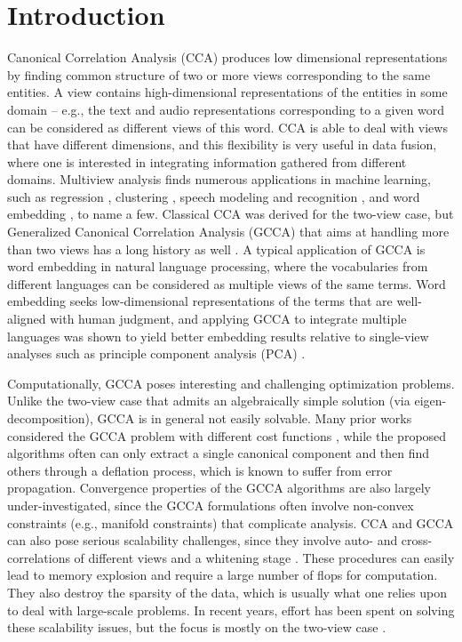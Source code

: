 \documentclass[10pt,journal]{IEEEtran}
\begin{document}
\section{Introduction}
Canonical Correlation Analysis (CCA) \cite{hardoon2004canonical} produces low dimensional representations by finding common structure of two or more views corresponding to the same entities.
A view contains high-dimensional representations of the entities in some domain -- e.g., the text and audio representations corresponding to a given word can be considered as different views of this word.
CCA is able to deal with views that have different dimensions, and this flexibility is very useful in data fusion, where one is interested in integrating information gathered from different domains.
Multiview analysis finds numerous applications in machine learning, such as regression \cite{kakade2007multi}, clustering \cite{chaudhuri2009multi}, speech modeling and recognition \cite{arora2014multi,wang2015acoustic}, and word embedding \cite{rastogimultiview}, to name a few.
Classical CCA was derived for the two-view case, but Generalized Canonical Correlation Analysis (GCCA) that aims at handling more than two views has a long history as well \cite{carroll1968generalization}.
A typical application of GCCA is word embedding in natural language processing, where the vocabularies from different languages can be considered as multiple views of the same terms.
Word embedding seeks low-dimensional representations of the terms that are well-aligned with human judgment, and applying GCCA to integrate multiple languages was shown to yield better embedding results relative to single-view analyses such as principle component analysis (PCA) \cite{rastogimultiview}.

Computationally, GCCA poses interesting and challenging optimization problems.
Unlike the two-view case that admits an algebraically simple solution (via eigen-decomposition),
GCCA is in general not easily solvable.
Many prior works considered the GCCA problem with different cost functions \cite{carroll1968generalization,kettenring1971canonical}, while the proposed algorithms often can only extract a single canonical component and then find others through a deflation process, which is known to suffer from error propagation.
Convergence properties of the GCCA algorithms are also largely under-investigated, since
the GCCA formulations often involve non-convex constraints (e.g., manifold constraints) that complicate analysis.
CCA and GCCA can also pose serious scalability challenges,
since they involve auto- and cross-correlations of different views and a whitening stage \cite{ma2015finding}.
These procedures can easily lead to memory explosion and require a large number of flops for computation.
They also destroy the sparsity of the data, which is usually what one relies upon to deal with large-scale problems.
In recent years, effort has been spent on solving these scalability issues, but the focus is mostly on the two-view case \cite{ma2015finding,sun2011canonical,lu2014large}.
\end{document}

